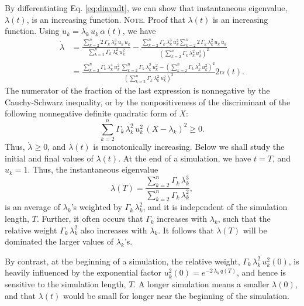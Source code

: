 \documentclass[reprint, floatfix]{revtex4-1}
\newcommand{\note}[1]{{\color{DarkGreen}\footnotesize \textsc{Note.} #1}}
\begin{document}
By differentiating Eq. \eqref{eq:dinvadt},
we can show that instantaneous eigenvalue,
$\lambda(t)$, is an increasing function.
%
\note{Proof that $\lambda(t)$ is an increasing function.
  Using $\dot u_k = \lambda_k \, u_k \, \alpha(t)$,
  we have
  $$
  \begin{aligned}
    \dot \lambda
    &=
    \frac
    {
      \sum_{k = 2}^n 2 \, \Gamma_k \, \lambda_k^3 \, u_k \, \dot u_k
    }
    {
      \sum_{k = 2}^n \Gamma_k \, \lambda_k^2 \, u_k^2
    }
    -
    \frac
    {
      \sum_{k = 2}^n \Gamma_k \, \lambda_k^3 \, u_k^2
      \sum_{k = 2}^n 2 \, \Gamma_k \, \lambda_k^2 \, u_k \, \dot u_k
    }
    {
      \left(
        \sum_{k = 2}^n \Gamma_k \, \lambda_k^2 \, u_k^2
      \right)^2
    }
    \\
    &=
    \frac
    {
      \sum_{k = 2}^n \Gamma_k \, \lambda_k^4 \, u_k^2
      \,
      \sum_{k = 2}^n \Gamma_k \, \lambda_k^2 \, u_k^2
      -
      \left(
        \sum_{k = 2}^n \Gamma_k \, \lambda_k^3 \, u_k^2
      \right)^2
    }
    {
      \left(
        \sum_{k = 2}^n \Gamma_k \, \lambda_k^2 \, u_k^2
      \right)^2
    }
    2 \alpha(t).
  \end{aligned}
  $$
  The numerator of the fraction of the last expression
  is nonnegative by the Cauchy-Schwarz inequality,
  or by the nonpositiveness of the discriminant
  of the following nonnegative definite quadratic form of $X$:
  $$
  \sum_{k = 2}^n \Gamma_k \, \lambda_k^2 \, u_k^2 \, (X - \lambda_k)^2 \ge 0.
  $$
  Thus, $\dot \lambda \ge 0$, and $\lambda(t)$ is monotonically increasing.
}
%
Below we shall study the initial and final values
of $\lambda(t)$.
%
At the end of a simulation,
we have $t = T$, and $u_k = 1$.
%
Thus,
the instantaneous eigenvalue
%
\begin{equation}
  \lambda(T)
  =
  \frac{
    \sum_{ k = 2 }^n
      \Gamma_k \, \lambda_k^3
  }
  {
    \sum_{ k = 2 }^n
      \Gamma_k \, \lambda_k^2
  }
  ,
  \label{eq:dinvadt_limit2}
\end{equation}
is an average of $\lambda_k$'s weighted
by $\Gamma_k \, \lambda_k^2$,
and it is independent of the simulation length, $T$.
%
Further, it often occurs that $\Gamma_k$
increases with $\lambda_k$,
such that the relative weight $\Gamma_k \, \lambda_k^2$
also increases with $\lambda_k$.
%
It follows that $\lambda(T)$ will be dominated
the larger values of $\lambda_k$'s.


By contrast,
at the beginning of a simulation,
the relative weight, $\Gamma_k \, \lambda_k^2 \, u_k^2(0)$,
is heavily influenced by the exponential factor
$u_k^2(0) = e^{ -2 \, \lambda_k \, q(T) }$,
and hence is sensitive to the simulation length, $T$.
%
A longer simulation means a smaller $\lambda(0)$,
and that $\lambda(t)$ would be small
for longer near the beginning of the simulation.
\end{document}
